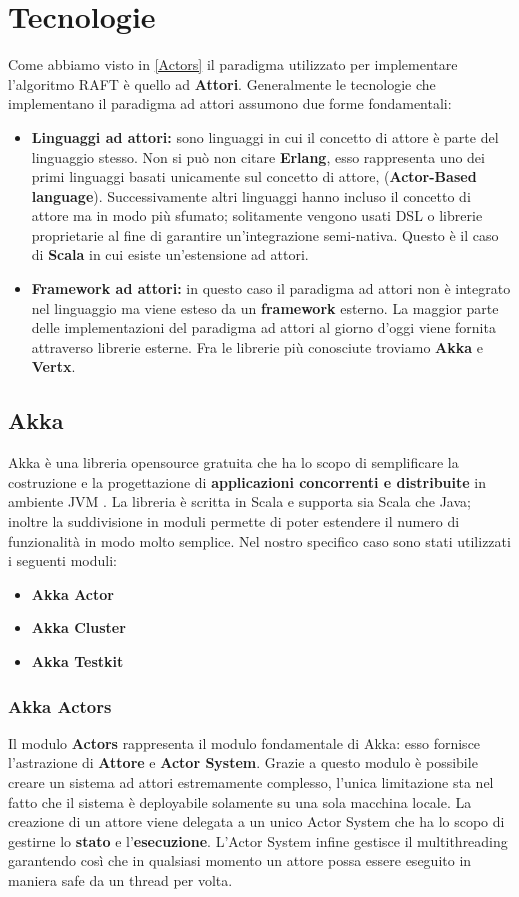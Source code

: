 \section{Tecnologie}
Come abbiamo visto in \ref{Actors} il paradigma utilizzato per implementare l'algoritmo RAFT è quello ad \textbf{Attori}. Generalmente le tecnologie che implementano il paradigma ad attori assumono due forme fondamentali:
\begin{itemize}
  \item{\textbf{Linguaggi ad attori: }}
  sono linguaggi in cui il concetto di attore è parte del linguaggio stesso. Non si può non citare \textbf{Erlang}, esso rappresenta uno dei primi linguaggi basati unicamente sul concetto di attore, (\textbf{Actor-Based language}). Successivamente altri linguaggi hanno incluso il concetto di attore ma in modo più sfumato; solitamente vengono usati DSL o librerie proprietarie al fine di garantire un'integrazione semi-nativa. Questo è il caso di \textbf{Scala} in cui esiste un'estensione ad attori.
  \item{\textbf{Framework ad attori: }}
  in questo caso il paradigma ad attori non è integrato nel linguaggio ma viene esteso da un \textbf{framework} esterno. La maggior parte delle implementazioni del paradigma ad attori al giorno d'oggi viene fornita attraverso librerie esterne. Fra le librerie più conosciute troviamo \textbf{Akka} e \textbf{Vertx}.
\end{itemize}

\subsection{Akka}
Akka è una libreria opensource gratuita che ha lo scopo di semplificare la costruzione e la progettazione di \textbf{applicazioni concorrenti e distribuite} in ambiente JVM \cite{akkaSite}. La libreria è scritta in Scala e supporta sia Scala che Java; inoltre la suddivisione in moduli permette di poter estendere il numero di funzionalità in modo molto semplice. Nel nostro specifico caso sono stati utilizzati i seguenti moduli:
\begin{itemize}
  \item{\textbf{Akka Actor}}
  \item{\textbf{Akka Cluster}}
  \item{\textbf{Akka Testkit}}
\end{itemize} 

  \subsubsection{Akka Actors}
  Il modulo \textbf{Actors} rappresenta il modulo fondamentale di Akka: esso fornisce l'astrazione di \textbf{Attore} e \textbf{Actor System}. Grazie a questo modulo è possibile creare un sistema ad attori estremamente complesso, l'unica limitazione sta nel fatto che il sistema è deployabile solamente su una sola macchina locale. La creazione di un attore viene delegata a un unico Actor System che ha lo scopo di gestirne lo \textbf{stato} e l'\textbf{esecuzione}. L'Actor System infine gestisce il multithreading garantendo così che in qualsiasi momento un attore possa essere eseguito in maniera safe da un thread per volta.   
